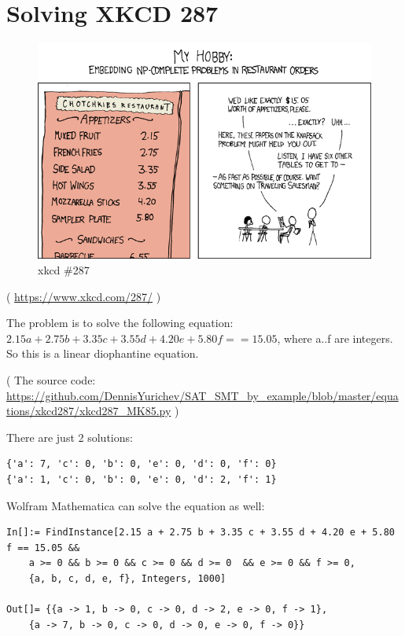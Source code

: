 \section{Solving XKCD 287}
\label{XkcdILP}

\begin{figure}[H]
\centering
\includegraphics[scale=7]{equations/xkcd287/np_complete.png}
\caption{xkcd \#287}
\end{figure}

( \url{https://www.xkcd.com/287/} )

The problem is to solve the following equation:
$2.15a + 2.75b + 3.35c + 3.55d + 4.20e + 5.80f == 15.05$,
where a..f are integers.
So this is a linear diophantine equation.



( The source code: \url{https://github.com/DennisYurichev/SAT_SMT_by_example/blob/master/equations/xkcd287/xkcd287_MK85.py} )

There are just 2 solutions:

\begin{lstlisting}
{'a': 7, 'c': 0, 'b': 0, 'e': 0, 'd': 0, 'f': 0}
{'a': 1, 'c': 0, 'b': 0, 'e': 0, 'd': 2, 'f': 1}
\end{lstlisting}

Wolfram Mathematica can solve the equation as well:

\begin{lstlisting}
In[]:= FindInstance[2.15 a + 2.75 b + 3.35 c + 3.55 d + 4.20 e + 5.80 f == 15.05 && 
	a >= 0 && b >= 0 && c >= 0 && d >= 0  && e >= 0 && f >= 0, 
	{a, b, c, d, e, f}, Integers, 1000]

Out[]= {{a -> 1, b -> 0, c -> 0, d -> 2, e -> 0, f -> 1},
	{a -> 7, b -> 0, c -> 0, d -> 0, e -> 0, f -> 0}}
\end{lstlisting}

